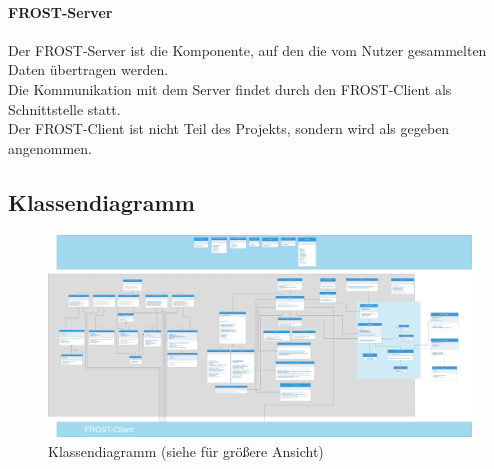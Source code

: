 \paragraph{FROST-Server}
Der FROST-Server ist die Komponente, auf den die vom Nutzer gesammelten Daten übertragen werden.\\
Die Kommunikation mit dem Server findet durch den FROST-Client als Schnittstelle statt.\\
Der FROST-Client ist nicht Teil des Projekts, sondern wird als gegeben angenommen.

\clearpage
\subsection{Klassendiagramm}

\begin{figure}[!h]
\centering
\includegraphics[angle =90, scale=0.13]{uml/screenshots/shape102}
\caption{Klassendiagramm (siehe  für größere Ansicht)}
\end{figure}